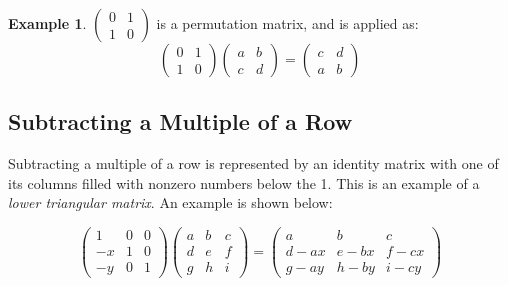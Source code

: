 \documentclass{article}
\theoremstyle{definition}
\newtheorem{example}{Example}[definition]
\begin{document}
\begin{example}
	\begin{math}
		\left(
			\begin{matrix}
				0 & 1 \\
				1 & 0
			\end{matrix}
		\right)
	\end{math} is a permutation matrix, and is applied as:
	\begin{equation*}
		\left(
			\begin{matrix}
				0 & 1 \\
				1 & 0
			\end{matrix}
		\right) \left(
			\begin{matrix}
				a & b \\
				c & d
			\end{matrix}
		\right) = \left(
			\begin{matrix}
				c & d \\
				a & b
			\end{matrix}
		\right)
	\end{equation*}
\end{example}

\subsection{Subtracting a Multiple of a Row}
Subtracting a multiple of a row is represented by an identity matrix with one of its columns filled with nonzero numbers below the 1. This is an example of a \emph{lower triangular matrix}. An example is shown below:

\begin{equation*}
	\left(
		\begin{matrix}
			1 & 0 & 0 \\
			-x & 1 & 0 \\
			-y & 0 & 1
		\end{matrix}
	\right) \left(
		\begin{matrix}
			a & b & c \\
			d & e & f \\
			g & h & i
		\end{matrix}
	\right) = \left(
		\begin{matrix}
			a & b & c \\
			d-ax & e-bx & f-cx \\
			g-ay & h-by & i-cy
		\end{matrix}
	\right)
\end{equation*}
\end{document}
